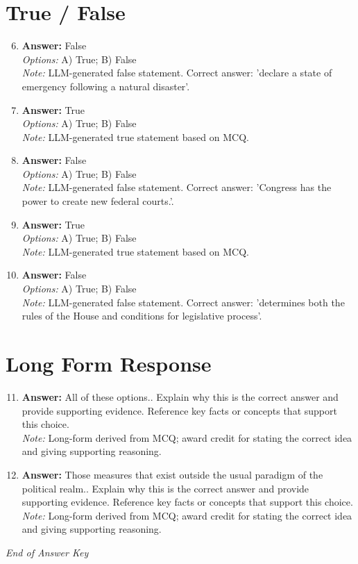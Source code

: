 \documentclass[12pt]{article}
\begin{document}
\section*{True / False}
\begin{enumerate}[label=\arabic*.]
\setcounter{enumi}{5}
\item \textbf{Answer:} False
\\ \textit{Options:} A) True; B) False
\\ \textit{Note:} LLM-generated false statement. Correct answer: 'declare a state of emergency following a natural disaster'.
\item \textbf{Answer:} True
\\ \textit{Options:} A) True; B) False
\\ \textit{Note:} LLM-generated true statement based on MCQ.
\item \textbf{Answer:} False
\\ \textit{Options:} A) True; B) False
\\ \textit{Note:} LLM-generated false statement. Correct answer: 'Congress has the power to create new federal courts.'.
\item \textbf{Answer:} True
\\ \textit{Options:} A) True; B) False
\\ \textit{Note:} LLM-generated true statement based on MCQ.
\item \textbf{Answer:} False
\\ \textit{Options:} A) True; B) False
\\ \textit{Note:} LLM-generated false statement. Correct answer: 'determines both the rules of the House and conditions for legislative process'.
\end{enumerate}

\section*{Long Form Response}
\begin{enumerate}[label=\arabic*.]
\setcounter{enumi}{10}
\item \textbf{Answer:} All of these options.. Explain why this is the correct answer and provide supporting evidence. Reference key facts or concepts that support this choice.
\\ \textit{Note:} Long-form derived from MCQ; award credit for stating the correct idea and giving supporting reasoning.
\item \textbf{Answer:} Those measures that exist outside the usual paradigm of the political realm.. Explain why this is the correct answer and provide supporting evidence. Reference key facts or concepts that support this choice.
\\ \textit{Note:} Long-form derived from MCQ; award credit for stating the correct idea and giving supporting reasoning.
\end{enumerate}

\vfill
\noindent\textit{End of Answer Key}
\end{document}
